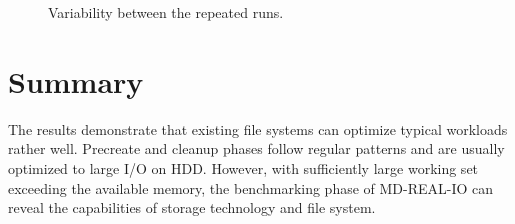 \documentclass[a4paper,10pt]{article}
\begin{document}
\begin{figure}
\centering
{}
\caption{Variability between the repeated runs. \label{fig:10variability}}
\end{figure}


\section{Summary}

The results demonstrate that existing file systems can optimize typical workloads rather well.
Precreate and cleanup phases follow regular patterns and are usually optimized to large I/O on HDD.
However, with sufficiently large working set exceeding the available memory, the benchmarking phase of MD-REAL-IO can reveal the capabilities of storage technology and file system.
\end{document}
